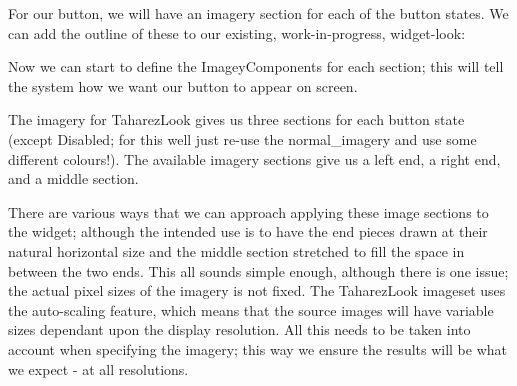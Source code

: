 For our button, we will have an imagery section for each of the button states. We can add the outline of these to our existing, work-\/in-\/progress, widget-\/look\+: 
\begin{DoxyCode}{0}
\DoxyCodeLine{}
\DoxyCodeLine{}
\DoxyCodeLine{}
\DoxyCodeLine{}
\DoxyCodeLine{}
\DoxyCodeLine{}
\DoxyCodeLine{}
\DoxyCodeLine{}
\DoxyCodeLine{}
\end{DoxyCode}


Now we can start to define the Imagey\+Components for each section; this will tell the system how we want our button to appear on screen.

The imagery for Taharez\+Look gives us three sections for each button state (except Disabled; for this we\textquotesingle{}ll just re-\/use the \textquotesingle{}normal\+\_\+imagery\textquotesingle{} and use some different colours!). The available imagery sections give us a left end, a right end, and a middle section.

There are various ways that we can approach applying these image sections to the widget; although the intended use is to have the end pieces drawn at their \textquotesingle{}natural\textquotesingle{} horizontal size and the middle section stretched to fill the space in between the two ends. This all sounds simple enough, although there is one issue; the actual pixel sizes of the imagery is not fixed. The Taharez\+Look imageset uses the auto-\/scaling feature, which means that the source images will have variable sizes dependant upon the display resolution. All this needs to be taken into account when specifying the imagery; this way we ensure the results will be what we expect -\/ at all resolutions.

